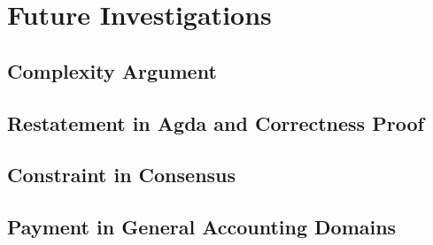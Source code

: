\documentclass[a4paper,10pt]{report}
\begin{document}
\chapter{Future Investigations}

\section{Complexity Argument}

\section{Restatement in Agda and Correctness Proof}

\section{Constraint in Consensus}

\section{Payment in General Accounting Domains}

\newpage
\printbibliography{}
\end{document}
